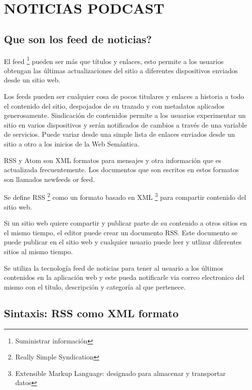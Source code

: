 \chapter{NOTICIAS PODCAST}

\section{\textquestiondown Que son los feed de noticias?}

El feed \footnote{Suministrar informaci\'{o}n} pueden ser m\'{a}s que t\'{i}tulos y enlaces, esto permite a los usuarios 
obtengan las \'{u}ltimas actualizaciones del sitio a diferentes dispositivos enviados desde un sitio web.

Los feeds pueden ser cualquier cosa de pocos titulares y enlaces a historia a todo el contenido del sitio, despojados
de su trazado y con metadatos aplicados generosamente. Sindicaci\'{o}n de contenidos permite a los usuarios experimentar
un sitio en varios dispositivos y ser\'{a}n notificados de cambios a trav\'{e}s de una variable de servicios. Puede 
variar desde una simple lista de enlaces enviados desde un sitio a otro a los inicios de la Web Sem\'{a}ntica.\cite{hammersley2005developing}

RSS y Atom son XML formatos para mensajes y otra informaci\'{o}n que es actualizada frecuentemente.
Los documentos que son escritos en estos formatos son llamados newfeeds or feed.\cite{wittenbrink2005rss}

Se define RSS \footnote{Really Simple Syndication} como un formato basado en XML \footnote{Extensible Markup Language: designado para almacenar y transportar datos} para compartir contenido del sitio web.

Si un sitio web quiere compartir y publicar parte de su contenido a otros sitios en el mismo tiempo, el editor puede crear un
documento RSS. Este documento se puede publicar en el sitio web y cualquier usuario puede leer y utlizar diferentes sitios al mismo
tiempo. \cite{zeki2004rss}

Se utiliza la tecnolog\'{i}a feed de noticias para tener al usuario a los \'{u}ltimos contenidos en la aplicaci\'{o}n web
y este pueda notificarle via correo electronico del mismo con el t\'{i}tulo, descripci\'{o}n y categor\'{i}a al que pertenece.

\section{Sintaxis: RSS como XML formato}

